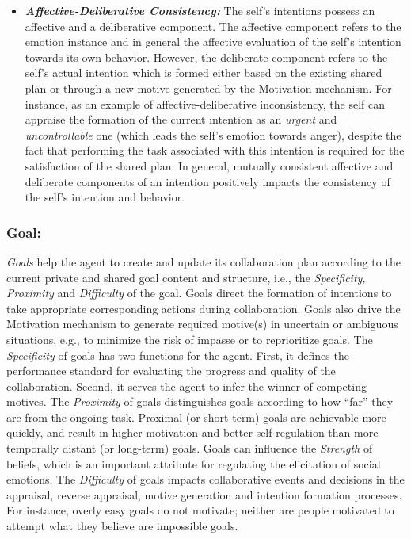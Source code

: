 \documentclass[letterpaper]{article}
\begin{document}
\begin{itemize}
  \item \textbf{\textit{Affective-Deliberative Consistency:}} The self's
  intentions possess an affective and a deliberative component. The affective
  component refers to the emotion instance and in general the affective
  evaluation of the self's intention towards its own behavior. However, the
  deliberate component refers to the self's actual intention which is formed
  either based on the existing shared plan or through a new motive generated by
  the Motivation mechanism. For instance, as an example of
  affective-deliberative inconsistency, the self can appraise the formation of
  the current intention as an \textit{urgent} and \textit{uncontrollable} one
  (which leads the self's emotion towards anger), despite the fact that
  performing the task associated with this intention is required for the
  satisfaction of the shared plan. In general, mutually consistent affective and
  deliberate components of an intention positively impacts the consistency of
  the self's intention and behavior.
\end{itemize}

\subsubsection{Goal:}

\textit{Goals} help the agent to create and update its collaboration plan
according to the current private and shared goal content and structure, i.e.,
the \textit{Specificity, Proximity} and \textit{Difficulty} of the goal. Goals
direct the formation of intentions to take appropriate corresponding actions
during collaboration. Goals also drive the Motivation mechanism to generate
required motive(s) in uncertain or ambiguous situations, e.g., to minimize the
risk of impasse or to reprioritize goals. The \textit{Specificity} of goals has
two functions for the agent. First, it defines the performance standard for
evaluating the progress and quality of the collaboration. Second, it serves the
agent to infer the winner of competing motives. The \textit{Proximity} of goals
distinguishes goals according to how ``far'' they are from the ongoing task.
Proximal (or short-term) goals are achievable more quickly, and result in higher
motivation and better self-regulation than more temporally distant (or
long-term) goals. Goals can influence the \textit{Strength} of beliefs, which is
an important attribute for regulating the elicitation of social emotions. The
\textit{Difficulty} of goals impacts collaborative events and decisions in the
appraisal, reverse appraisal, motive generation and intention formation
processes. For instance, overly easy goals do not motivate; neither are people
motivated to attempt what they believe are impossible goals.
\end{document}
